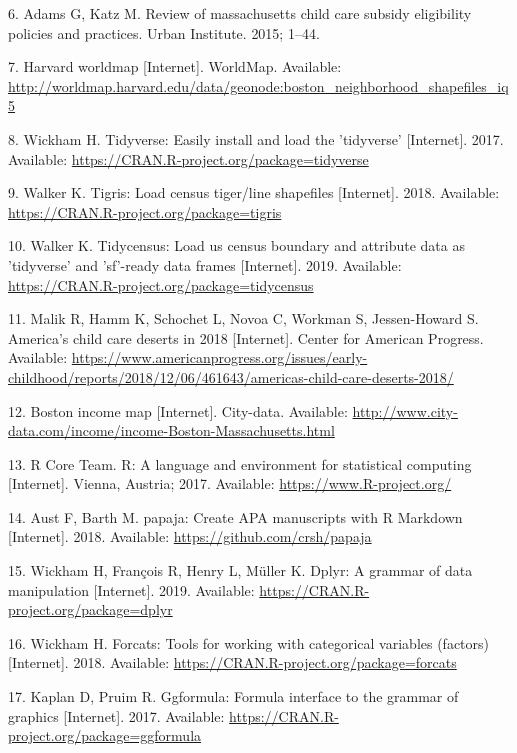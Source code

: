\documentclass[10pt,letterpaper]{article}
\begin{document}
\hypertarget{ref-adams_katz_2015}{}
6. Adams G, Katz M. Review of massachusetts child care subsidy
eligibility policies and practices. Urban Institute. 2015; 1--44.

\hypertarget{ref-bostonshapefile}{}
7. Harvard worldmap {[}Internet{]}. WorldMap. Available:
\url{http://worldmap.harvard.edu/data/geonode:boston_neighborhood_shapefiles_iq5}

\hypertarget{ref-R-tidyverse}{}
8. Wickham H. Tidyverse: Easily install and load the 'tidyverse'
{[}Internet{]}. 2017. Available:
\url{https://CRAN.R-project.org/package=tidyverse}

\hypertarget{ref-R-tigris}{}
9. Walker K. Tigris: Load census tiger/line shapefiles {[}Internet{]}.
2018. Available: \url{https://CRAN.R-project.org/package=tigris}

\hypertarget{ref-R-tidycensus}{}
10. Walker K. Tidycensus: Load us census boundary and attribute data as
'tidyverse' and 'sf'-ready data frames {[}Internet{]}. 2019. Available:
\url{https://CRAN.R-project.org/package=tidycensus}

\hypertarget{ref-childcare_desert}{}
11. Malik R, Hamm K, Schochet L, Novoa C, Workman S, Jessen-Howard S.
America's child care deserts in 2018 {[}Internet{]}. Center for American
Progress. Available:
\url{https://www.americanprogress.org/issues/early-childhood/reports/2018/12/06/461643/americas-child-care-deserts-2018/}

\hypertarget{ref-bostonmap}{}
12. Boston income map {[}Internet{]}. City-data. Available:
\url{http://www.city-data.com/income/income-Boston-Massachusetts.html}

\hypertarget{ref-R-base}{}
13. R Core Team. R: A language and environment for statistical computing
{[}Internet{]}. Vienna, Austria; 2017. Available:
\url{https://www.R-project.org/}

\hypertarget{ref-R-papaja}{}
14. Aust F, Barth M. papaja: Create APA manuscripts with R Markdown
{[}Internet{]}. 2018. Available: \url{https://github.com/crsh/papaja}

\hypertarget{ref-R-dplyr}{}
15. Wickham H, François R, Henry L, Müller K. Dplyr: A grammar of data
manipulation {[}Internet{]}. 2019. Available:
\url{https://CRAN.R-project.org/package=dplyr}

\hypertarget{ref-R-forcats}{}
16. Wickham H. Forcats: Tools for working with categorical variables
(factors) {[}Internet{]}. 2018. Available:
\url{https://CRAN.R-project.org/package=forcats}

\hypertarget{ref-R-ggformula}{}
17. Kaplan D, Pruim R. Ggformula: Formula interface to the grammar of
graphics {[}Internet{]}. 2017. Available:
\url{https://CRAN.R-project.org/package=ggformula}
\end{document}

